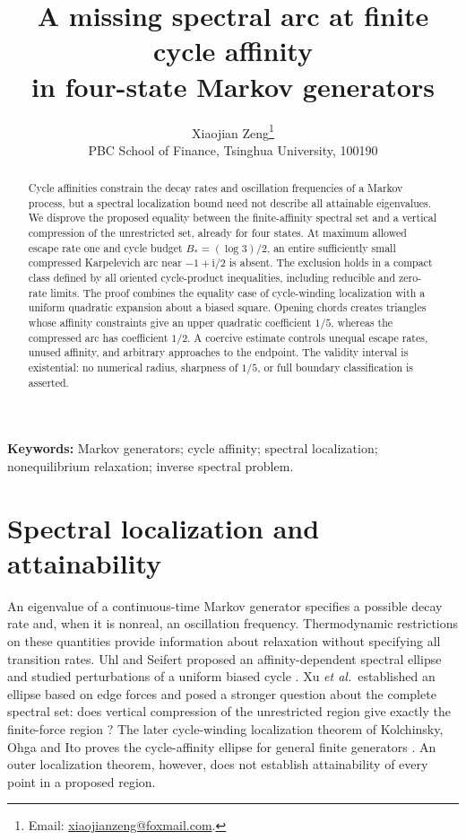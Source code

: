\documentclass[11pt,a4paper]{article}
\title{A missing spectral arc at finite cycle affinity\protect\\ in four-state Markov generators}
\author{Xiaojian Zeng\thanks{Email: \href{mailto:xiaojianzeng@foxmail.com}{xiaojianzeng@foxmail.com}.}\\[3pt]
\small PBC School of Finance, Tsinghua University, 100190}
\date{}
\newcommand{\ii}{\mathrm i}
\begin{document}
\maketitle

\begin{abstract}
Cycle affinities constrain the decay rates and oscillation frequencies of a
Markov process, but a spectral localization bound need not describe all
attainable eigenvalues. We disprove the proposed equality between the
finite-affinity spectral set and a vertical compression of the unrestricted
set, already for four states. At maximum allowed escape rate one and cycle
budget $B_*=(\log 3)/2$, an entire sufficiently small compressed Karpelevich
arc near $-1+\ii/2$ is absent. The exclusion holds in a compact class defined
by all oriented cycle-product inequalities, including reducible and
zero-rate limits. The proof combines the equality case of cycle-winding
localization with a uniform quadratic expansion about a biased square.
Opening chords creates triangles whose affinity constraints give an upper
quadratic coefficient $1/5$, whereas the compressed arc has coefficient
$1/2$. A coercive estimate controls unequal escape rates, unused affinity,
and arbitrary approaches to the endpoint. The validity interval is
existential: no numerical radius, sharpness of $1/5$, or full boundary
classification is asserted.
\end{abstract}

\noindent\textbf{Keywords:} Markov generators; cycle affinity; spectral
localization; nonequilibrium relaxation; inverse spectral problem.

\section{Spectral localization and attainability}

An eigenvalue of a continuous-time Markov generator specifies a possible
decay rate and, when it is nonreal, an oscillation frequency. Thermodynamic
restrictions on these quantities provide information about relaxation
without specifying all transition rates. Uhl and Seifert proposed an
affinity-dependent spectral ellipse and studied perturbations of a uniform
biased cycle \cite{UhlSeifert2019}. Xu \emph{et al.}\ established an ellipse
based on edge forces and posed a stronger question about the complete
spectral set: does vertical compression of the unrestricted region give
exactly the finite-force region \cite[End Matter and Supplementary
Eq.~(S3)]{Xu2025}? The later cycle-winding localization theorem of
Kolchinsky, Ohga and Ito proves the cycle-affinity ellipse for general
finite generators \cite[Theorem~3 and Table~I]{Kolchinsky2026}.
An outer localization theorem, however, does not establish attainability
of every point in a proposed region.
\end{document}
